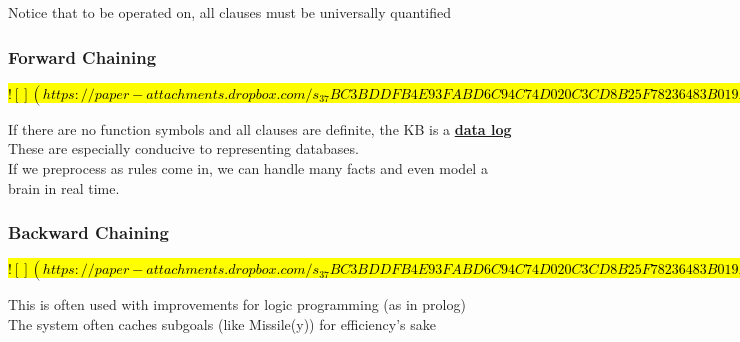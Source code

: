\documentclass[../../lecture_notes.tex]{subfiles}
\begin{document}
\noindent Notice that to be operated on, all clauses must be universally quantified

\subsubsection*{Forward Chaining}
\hl{
$![](https://paper-attachments.dropbox.com/s_37BC3BDDFB4E93FABD6C94C74D020C3CD8B25F78236483B019E726793416E36E_1589436072359_Untitled+drawing+20.jpg)$
}

\noindent If there are no function symbols and all clauses are definite, the KB is a \textbf{\underline{data log}}\\
\indent These are especially conducive to representing databases.\\
If we preprocess as rules come in, we can handle many facts and even model a brain in real time.\\

\subsubsection*{Backward Chaining}
\hl{
$![](https://paper-attachments.dropbox.com/s_37BC3BDDFB4E93FABD6C94C74D020C3CD8B25F78236483B019E726793416E36E_1589436972651_Untitled+drawing+21.jpg)$
}

\noindent This is often used with improvements for logic programming (as in prolog)\\
The system often caches subgoals (like Missile(y)) for efficiency’s sake
\end{document}
